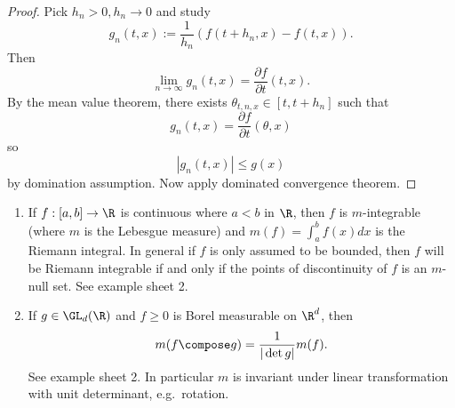 \documentclass[a4paper]{article}
\begin{document}
\begin{proof}
  Pick \(h_n > 0, h_n \to 0\) and study
  \[
    g_n(t, x) := \frac{1}{h_n} (f(t + h_n, x) - f(t, x)).
  \]
  Then
  \[
    \lim_{n \to \infty} g_n(t, x) = \frac{\partial f}{\partial t}(t, x).
  \]
  By the mean value theorem, there exists \(\theta_{t, n, x} \in [t, t + h_n]\) such that
  \[
    g_n(t, x) = \frac{\partial f}{\partial t}(\theta, x)
  \]
  so
  \[
    |g_n(t, x)| \leq g(x)
  \]
  by domination assumption. Now apply dominated convergence theorem.
\end{proof}

\begin{remark}\leavevmode
  \begin{enumerate}
  \item If \(f: [a, b] \to \R\) is continuous where \(a < b\) in \(\R\), then \(f\) is \(m\)-integrable (where \(m\) is the Lebesgue measure) and \(m(f) = \int_a^b f(x)dx\) is the Riemann integral. In general if \(f\) is only assumed to be bounded, then \(f\) will be Riemann integrable if and only if the points of discontinuity of \(f\) is an \(m\)-null set. See example sheet 2.
  \item If \(g \in \GL_d(\R)\) and \(f \geq 0\) is Borel measurable on \(\R^d\), then
    \[
      m(f \compose g) = \frac{1}{|\det g|} m(f).
    \]
    See example sheet 2. In particular \(m\) is invariant under linear transformation with unit determinant, e.g.\ rotation.
  \end{enumerate}
\end{remark}
















\printindex
\end{document}
